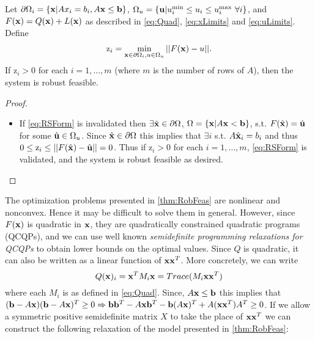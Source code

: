 \begin{thm} \label{thm:RobFeas}
Let $\partial\Omega_i=\{\bold x| Ax_i = b_i, A\bold x\leq \bold b\}$, $\Omega_{u}=\{\bold u| u^{\min}_i\leq u_i \leq u^{\max}_i \ \forall i \}$, and $F(\bold x)=Q(\bold x)+L(\bold x)$ as described in \eqref{eq:Quad}, \eqref{eq:xLimits} and \eqref{eq:uLimits}. Define
\begin{align}
\mathrm{z}_i =  \min_{\bold x\in\partial\Omega_i, u\in \Omega_u} ||F(\bold x)-u||. \label{eq:OPTfeas}
\end{align}
If $\mathrm{z}_i>0$ for each $i = 1, \ldots, m$ (where $m$ is the number of rows of $A$), then the system is robust feasible.

\begin{proof} \ \\
\begin{itemize}
\item[] If \eqref{eq:RSForm} is invalidated then $\exists \hat{\bold x}\in\partial\Omega$, $\Omega=\{\bold x| A\bold x< \bold b\}$, s.t. $F(\hat{\bold x})=\hat{\bold u}$ for some $\hat{\bold u}\in \Omega_u$. 
Since $\hat{\bold x}\in\partial\Omega$ this implies that $\exists i$ s.t. $A\hat{\bold x}_i=b_i$ and thus $0\leq \mathrm{z}_i \leq ||F(\hat{\bold x})-\hat{\bold u}||=0$.
Thus if $\mathrm{z}_i>0$ for each $i = 1, \ldots, m$, \eqref{eq:RSForm} is validated, and the system is robust feasible as desired.
\end{itemize}
\end{proof}
\end{thm}



The optimization problems presented in \cref{thm:RobFeas} are nonlinear and nonconvex.
Hence it may be difficult to solve them in general.
However, since $F(\bold x)$ is quadratic in $\bold x$, they are quadratically constrained quadratic programs (QCQPs), and we can use well known \emph{semidefinite programming relaxations for QCQPs} 
to obtain lower bounds on the optimal values.\cite{VaBo1996} 
Since $Q$ is quadratic, it can also be written as a linear function of $\bold x\bold x^T$.
More concretely, we can write
$$Q(\bold x)_i=\bold x^TM_i\bold x=Trace(M_i\bold x\bold x^T)$$
where each $M_i$ is as defined in \eqref{eq:Quad}. 
Since, $A\bold x\leq \bold b$ this implies that $(\bold b-A\bold x)(\bold b-A\bold x)^T\geq 0\Rightarrow \bold b\bold b^T-A\bold x\bold b^T-\bold b(A\bold x)^T+A(\bold x\bold x^T)A^T\geq 0$. 
If we allow a symmetric positive semidefinite matrix $X$ to take the place of $\bold x\bold x^T$ we can construct the following relaxation of the model presented in \cref{thm:RobFeas}:
 
